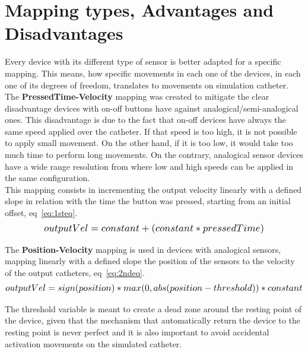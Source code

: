 \section{Mapping types, Advantages and Disadvantages}\label{sec:mapping}
Every device with its different type of sensor is better adapted for a specific mapping. This means, how specific movements in each one of the devices, in each one of its degrees of freedom, translates to movements on simulation catheter.\\

The \textbf{PressedTime-Velocity} mapping was created to mitigate the clear disadvantage devices with on-off buttons have against analogical/semi-analogical ones. This disadvantage is due to the fact that on-off devices have always the same speed applied over the catheter. If that speed is too high, it is not possible to apply small movement. On the other hand, if it is too low, it would take too much time to perform long movements. On the contrary, analogical sensor devices have a wide range resolution from where low and high speeds can be applied in the same configuration.\\

This mapping consists in incrementing the output velocity linearly with a defined slope in relation with the time the button was pressed, starting from an initial offset, eq~\ref{eq:1steq}.\\

\begin{equation}
   \scalebox{1.2}{$outputVel=constant+(constant*pressedTime)$}
   \centering
   \label{eq:1steq}
\end{equation}

The \textbf{Position-Velocity} mapping is used in devices with analogical sensors, mapping linearly with a defined slope the position of the sensors to the velocity of the output catheters, eq~\ref{eq:2ndeq}.\\

\begin{equation}
   \scalebox{1.2}{$outputVel=sign(position)*max(0,abs(position-threshold))*constant$}
   \centering
   \label{eq:2ndeq}
\end{equation}

The threshold variable is meant to create a dead zone around the resting point of the device, given that the mechanism that automatically return the device to the resting point is never perfect and it is also important to avoid accidental activation movements on the simulated catheter.\\

